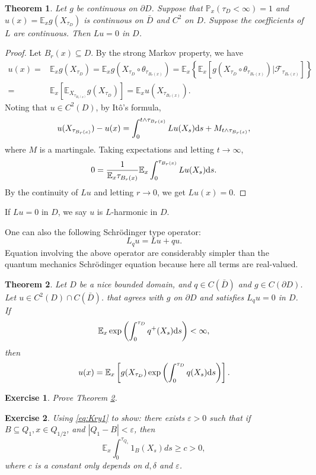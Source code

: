 \documentclass[twoside, 12pt]{book}
\numberwithin{equation}{chapter}
\newtheorem{theorem}{Theorem}[section]
\newtheorem{exercise}{Exercise}[section]
\def\cF{{\mathcal F}}
\def\mE{{\mathbb E}}
\def\mP{{\mathbb P}}
\def\l{\left}
\def\r{\right}
\def\geq{\geqslant}
\def\p{\partial}
\def\d{\text{\rm{d}}}
\begin{document}
	\begin{theorem}
		Let $g$ be continuous on $\p D$. Suppose that $\mP_x\l( \tau_D<\infty\r)=1$ and $u(x)=\mE_x g(X_{\tau_D})$ is continuous on $\bar D$ and $C^2$ on $D$. Suppose the coefficients of $L$ are continuous. Then $L u=0$ in $D$.
	\end{theorem}
    \begin{proof}
    Let $B_r(x)\subseteq D$. By the strong Markov property, we have 
        \begin{align*}
          u(x)=&\mE_x g(X_{\tau_D})= \mE_x g(X_{\tau_{D}}\circ \theta_{\tau_{B_r(x)}})=\mE_x \l\{ \mE_x \l[ g(X_{\tau_{D}}\circ \theta_{\tau_{B_r(x)}})\Big|\cF_{\tau_{B_r(x)}}\r] \r\}\\
          =&\mE_x \l[ \mE_{X_{\tau_{B_r(x)}}} g(X_{\tau_D})\r]= \mE_x u(X_{\tau_{B_r(x)}}). 
        \end{align*}
     Noting that $u\in C^2(D)$, by It\^o's formula, 
     \[
         u(X_{\tau_{B_r(x)}})-u(x) = \int_0^{t\wedge \tau_{B_r(x)}} L u (X_s) \d s+ M_{t\wedge \tau_{B_r(x)}}, 
     \]
     where $M$ is a martingale. Taking expectations and letting $t\to\infty$, 
     \[
        0= \frac{1}{\mE_x\tau_{B_r(x)}}\mE_x \int_0^{\tau_{B_r(x)}} L u(X_s) \d s.  
     \]
     By the continuity of $Lu$ and letting $r\to0$, we get $Lu(x)=0$. 
     \end{proof}
		
	If $Lu=0$ in $D$, we say $u$ is $L$-harmonic in $D$.

    One can also the following Schrödinger type operator: 
    \[
      L_q u= Lu+q u. 
    \]
   Equation involving the above operator are considerably simpler than the quantum mechanics Schrödinger equation because here all terms are real-valued. 

   \begin{theorem}\label{thm:FK2}
       Let $D$ be a nice bounded domain, and $q\in C(\bar D)$ and $g\in C(\p D)$. Let $u\in C^2(D)\cap C(\bar D)$. that agrees with $g$  on $\p D$ and satisfies $L_q u=0$ in $D$. If 
       \[
          \mE_x \exp\l(\int_0^{\tau_D}q^+(X_s) \d s\r)<\infty, 
       \]
       then 
       \[
         u(x)=\mE_x \l[ g(X_{\tau_D})\exp\l(\int_0^{\tau_D}q(X_s) \d s\r)\r].
       \]
   \end{theorem}
   
	\begin{exercise}
	    Prove Theorem \ref{thm:FK2}. 
	\end{exercise}
	\begin{exercise}
	   Using \eqref{eq:Kry1} to show: there exists $\varepsilon>0$ such that if $B \subseteq Q_1, x \in Q_{1/2}$, and $|Q_1-B|<\varepsilon$, then
$$
\mathbb{E}_x \int_0^{\tau_{Q_1}} 1_B\left(X_s\right) d s \geq c>0, 
$$
where $c$ is a constant only depends on $d,\delta$ and $\varepsilon$. 
	\end{exercise}
	
\end{document}
